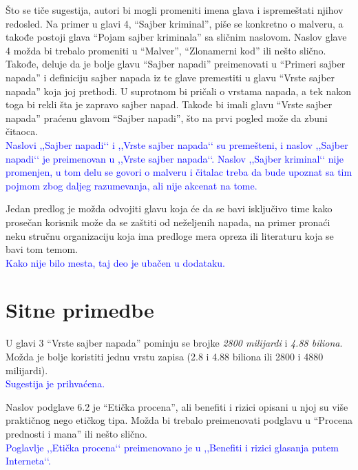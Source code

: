 \documentclass[a4paper]{report}
\newcommand{\odgovor}[1]{\textcolor{blue}{#1}}
\begin{document}
Što se tiče sugestija, autori bi mogli promeniti imena glava i ispremeštati njihov redosled. Na primer u glavi 4, ``Sajber kriminal'', piše se konkretno o malveru, a takođe postoji glava ``Pojam sajber kriminala'' sa sličnim naslovom. Naslov glave 4 možda bi trebalo promeniti u ``Malver'', ``Zlonamerni kod'' ili nešto slično. Takođe, deluje da je bolje glavu ``Sajber napadi'' preimenovati u ``Primeri sajber napada'' i definiciju sajber napada iz te glave premestiti u glavu ``Vrste sajber napada'' koja joj prethodi. U suprotnom bi pričali o vrstama napada, a tek nakon toga bi rekli šta je zapravo sajber napad. Takođe bi imali glavu ``Vrste sajber napada'' praćenu glavom ``Sajber napadi'', što na prvi pogled može da zbuni čitaoca.\\
\odgovor{Naslovi ,,Sajber napadi‘‘ i ,,Vrste sajber napada‘‘ su premešteni, i naslov ,,Sajber napadi‘‘ je preimenovan u ,,Vrste sajber napada‘‘. Naslov ,,Sajber kriminal‘‘ nije promenjen, u tom delu se govori o malveru i čitalac treba da bude upoznat sa tim pojmom zbog daljeg razumevanja, ali nije akcenat na tome.}

Jedan predlog je možda odvojiti glavu koja će da se bavi isključivo time kako prosečan korisnik može da se zaštiti od neželjenih napada, na primer pronaći neku stručnu organizaciju koja ima predloge mera opreza ili literaturu koja se bavi tom temom.\\
\odgovor{Kako nije bilo mesta, taj deo je ubačen u dodataku.}


\section{Sitne primedbe}
U glavi 3 ``Vrste sajber napada'' pominju se brojke \textit{2800 milijardi} i \textit{4.88 biliona}. Možda je bolje koristiti jednu vrstu zapisa (2.8 i 4.88 biliona ili 2800 i 4880 milijardi).\\
\odgovor{Sugestija je prihvaćena.}

Naslov podglave 6.2 je ``Etička procena'', ali benefiti i rizici opisani u njoj su više praktičnog nego etičkog tipa. Možda bi trebalo preimenovati podglavu u ``Procena prednosti i mana'' ili nešto slično.\\
\odgovor{Poglavlje ,,Etička procena‘‘ preimenovano je u ,,Benefiti i rizici glasanja putem Interneta‘‘.}
\end{document}
